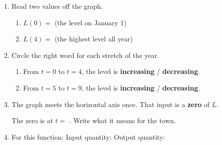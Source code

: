 \documentclass[10pt]{article}
\begin{document}
\boxguard
\begin{tcolorbox}[colback=white, colframe=black!40,
    title=\textbf{Tier R --- Remediate},
    fonttitle=\bfseries, arc=2mm, left=3mm, right=3mm, top=2mm, bottom=2mm]

\begin{enumerate}[itemsep=8pt]
  \item Read two values off the graph.

        \begin{enumerate}[label=(\alph*), itemsep=4pt]
          \item $L(0) = $ \blank{1.6cm} \quad (the level on January 1)
          \item $L(4) = $ \blank{1.6cm} \quad (the highest level all year)
        \end{enumerate}

  \item Circle the right word for each stretch of the year.

        \begin{enumerate}[label=(\alph*), itemsep=4pt]
          \item From $t = 0$ to $t = 4$, the level is
                \textbf{increasing} / \textbf{decreasing}.
          \item From $t = 5$ to $t = 9$, the level is
                \textbf{increasing} / \textbf{decreasing}.
        \end{enumerate}

  \item The graph meets the horizontal axis once. That input is a
        \textbf{zero} of $L$.

        \vspace{0.05in}
        The zero is at $t = $ \blank{1.6cm}. Write what it means for the town.

        \vspace{0.05in}

  \item For this function: \quad Input quantity: \blank{3.2cm} \quad
        Output quantity: \blank{4.4cm}
\end{enumerate}
\end{tcolorbox}

\vspace{0.1in}
\end{document}
